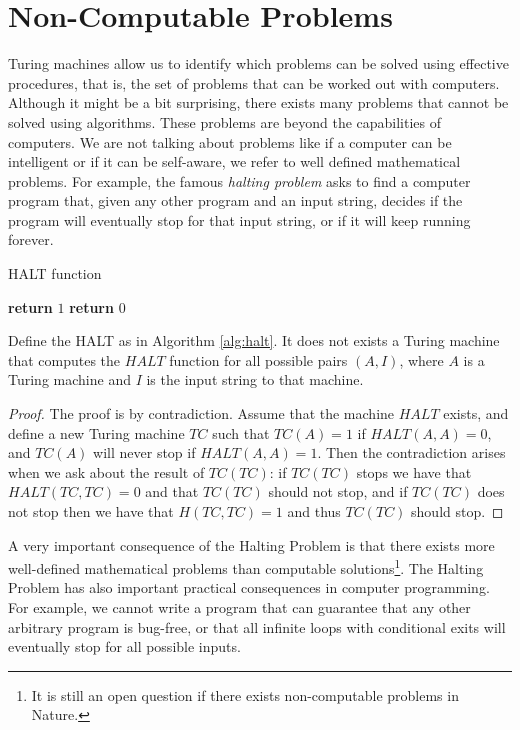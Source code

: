 \section{Non-Computable Problems}
\label{sec:non_computable_problems}

Turing machines allow us to identify which problems can be solved using effective procedures, that is, the set of problems that can be worked out with computers. Although it might be a bit surprising, there exists many problems that cannot be solved using algorithms. These problems are beyond the capabilities of computers. We are not talking about problems like if a computer can be intelligent or if it can be self-aware, we refer to well defined mathematical problems. For example, the famous \emph{halting problem} asks to find a computer program that, given any other program and an input string, decides if the program will eventually stop for that input string, or if it will keep running forever.

\begin{algorithm}
\caption{HALT function}
\label{alg:halt}
\begin{algorithmic}
        \State \textbf{return} $1$
    \Else
        \State \textbf{return} $0$
    \EndIf
\EndProcedure
\end{algorithmic}
\end{algorithm}

\begin{theorem}
\label{th:halting-problem}
Define the HALT as in Algorithm \ref{alg:halt}. It does not exists a Turing machine that computes the $HALT$ function for all possible pairs $(A, I)$, where $A$ is a Turing machine and $I$ is the input string to that machine.
\end{theorem}
\begin{proof}
The proof is by contradiction. Assume that the machine $HALT$  exists, and define a new Turing machine $TC$ such that $TC(A) = 1$ if $HALT(A,A) = 0$, and $TC(A)$ will never stop if $HALT(A,A) = 1$. Then the contradiction arises when we ask about the result of $TC(TC)$: if $TC(TC)$ stops we have that $HALT(TC,TC) = 0$ and that $TC(TC)$ should not stop, and if $TC(TC)$ does not stop then we have that $H(TC,TC) = 1$ and thus $TC(TC)$ should stop.
\end{proof}

A very important consequence of the Halting Problem is that there exists more well-defined mathematical problems than computable solutions\footnote{It is still an open question if there exists non-computable problems in Nature.}. The Halting Problem has also important practical consequences in computer programming. For example, we cannot write a program that can guarantee that any other arbitrary program is bug-free, or that all infinite loops with conditional exits will eventually stop for all possible inputs.

